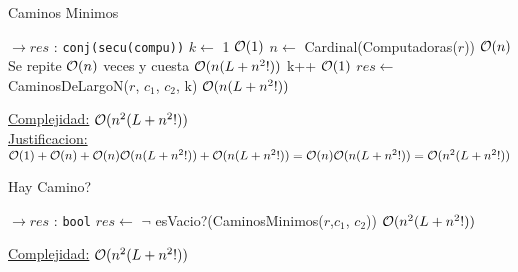 \begin{Algoritmos}
\begin{algorithm}
\caption{Caminos Minimos}
\begin{algorithmic}[1]
   $\to res$ : \texttt{conj(secu(compu))}  
   \State $k \gets$ 1 \Comment $\mathcal{O}(1)$
   \State $n \gets$ Cardinal(Computadoras($r$))  \Comment $\mathcal{O}(n)$
    \Comment Se repite $\mathcal{O}(n)$ veces y cuesta  $\mathcal{O}(n(L + n^2!))$
     \State k++ \Comment $\mathcal{O}(1)$
   \EndWhile
   \State $res \gets$ CaminosDeLargoN($r$, $c_1$, $c_2$, k) \Comment $\mathcal{O}(n(L + n^2!))$
\EndProcedure
\end{algorithmic}
\underline{Complejidad:} $\mathcal{O}(n^2 (L + n^2!))$ \\ 
\underline{Justificacion:} $\mathcal{O}(1) + \mathcal{O}(n) + \mathcal{O}(n)\mathcal{O}(n(L + n^2!)) + \mathcal{O}(n(L + n^2!)) = \mathcal{O}(n)\mathcal{O}(n(L + n^2!)) = \mathcal{O}(n^2(L + n^2!))$
\end{algorithm}


\begin{algorithm}
\caption{Hay Camino?}
\begin{algorithmic}[1]
   $\to res$ : \texttt{bool} 
   \State $res \gets$ $\neg$ esVacio?(CaminosMinimos($r$,$c_1$, $c_2$)) \Comment  $\mathcal{O}(n^2 (L + n^2!))$ 
\EndProcedure
\end{algorithmic}
\underline{Complejidad:} $\mathcal{O}(n^2 (L + n^2!))$
\end{algorithm}


\end{Algoritmos}
